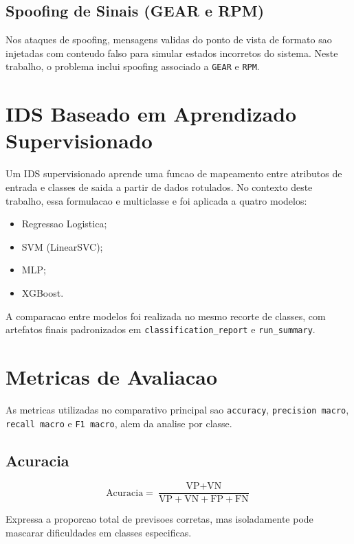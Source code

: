 \subsection{Spoofing de Sinais (GEAR e RPM)}

Nos ataques de spoofing, mensagens validas do ponto de vista de formato sao injetadas com conteudo falso para simular estados incorretos do sistema. Neste trabalho, o problema inclui spoofing associado a \texttt{GEAR} e \texttt{RPM}.

\section{IDS Baseado em Aprendizado Supervisionado}

Um IDS supervisionado aprende uma funcao de mapeamento entre atributos de entrada e classes de saida a partir de dados rotulados. No contexto deste trabalho, essa formulacao e multiclasse e foi aplicada a quatro modelos:

\begin{itemize}
    \item Regressao Logistica;
    \item SVM (LinearSVC);
    \item MLP;
    \item XGBoost.
\end{itemize}

A comparacao entre modelos foi realizada no mesmo recorte de classes, com artefatos finais padronizados em \texttt{classification\_report} e \texttt{run\_summary}.

\section{Metricas de Avaliacao}

As metricas utilizadas no comparativo principal sao \texttt{accuracy}, \texttt{precision macro}, \texttt{recall macro} e \texttt{F1 macro}, alem da analise por classe.

\subsection{Acuracia}

\begin{equation}
\text{Acuracia} = \frac{\text{VP} + \text{VN}}{\text{VP} + \text{VN} + \text{FP} + \text{FN}}
\end{equation}

Expressa a proporcao total de previsoes corretas, mas isoladamente pode mascarar dificuldades em classes especificas.

